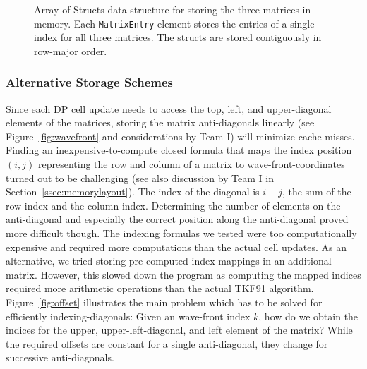 \documentclass[runningheads,a4paper]{llncs}
\begin{document}
\begin{figure}[width=\textwidth]
\centering
{}
\caption{Array-of-Structs data structure for storing the three matrices in memory. Each \texttt{MatrixEntry} element stores
the entries of a single index for all three matrices. The structs are stored contiguously in row-major order.}
\label{fig:aos}
\end{figure}

\subsubsection{Alternative Storage Schemes}
\label{par:otherattempts}

Since each DP cell update needs to access the top, left, and upper-diagonal elements of the matrices,
storing the matrix anti-diagonals linearly (see Figure~\ref{fig:wavefront} and considerations by Team I)
will minimize cache misses.
Finding an inexpensive-to-compute closed formula that maps the index position $(i,j)$ representing the row and column of a matrix
to wave-front-coordinates turned out to be challenging (see also discussion by Team I in Section~\ref{ssec:memorylayout}).
The index of the diagonal is $i+j$, the sum of the row index and the column index.
Determining the number of elements on the anti-diagonal and especially the correct position along the anti-diagonal proved more difficult though.
The indexing formulas we tested were too computationally expensive and required more computations than the actual cell updates.
As an alternative, we tried storing pre-computed index mappings in an additional matrix.
However, this slowed down the program as computing the mapped indices required more arithmetic operations than the actual TKF91 algorithm.
Figure~\ref{fig:offset} illustrates the main problem which has to be solved
for efficiently indexing-diagonals: Given an wave-front index $k$, how do we obtain the indices for the upper, upper-left-diagonal, and left element of the matrix?
While the required offsets are constant for a single anti-diagonal, they change for successive anti-diagonals.
\end{document}
